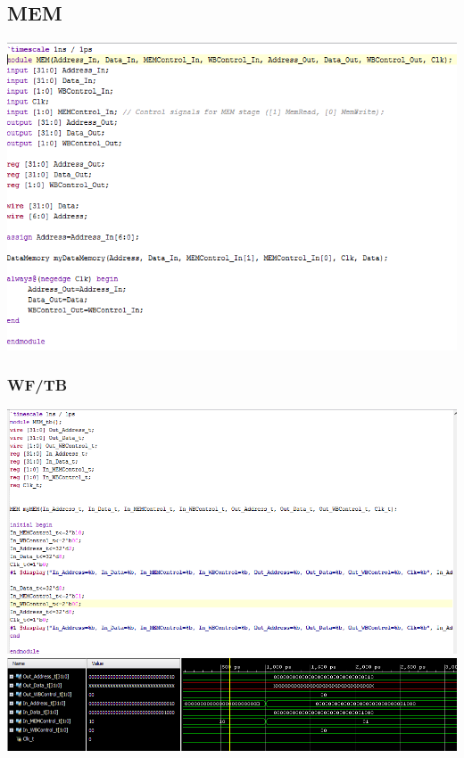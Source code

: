 \documentclass{llncs}
\begin{document}
\begin{addmargin}[-5em]{-2em}
\subsection{MEM}
\label{mem:1}
\begin{flushleft}
  \includegraphics[scale=.6]{../Screenshots/MEM.PNG}
  \end{flushleft}
\subsubsection{WF/TB}
\begin{flushleft}
\includegraphics[scale=.6]{../Screenshots/MEM_tb.PNG}
\includegraphics[scale=.6]{../Screenshots/MEM_Waveform.PNG}
\end{flushleft}


\end{addmargin}
\end{document}
